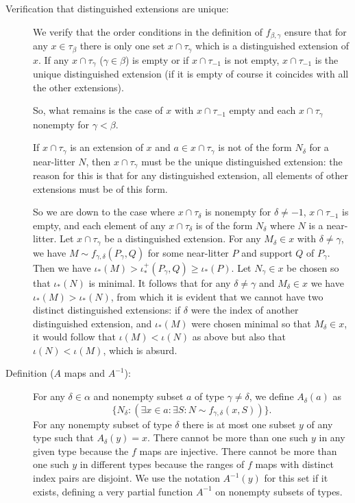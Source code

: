 \documentclass[112pt]{article}
\begin{document}
\begin{description}

\item[Verification that distinguished extensions are unique:]  

We verify  that the order conditions in the definition of $f_{\beta,\gamma}$ ensure that for any $x \in \tau_\beta$ there is only one set $x \cap \tau_\gamma$ which is a distinguished extension of $x$.  If any $x \cap \tau_\gamma$ ($\gamma \in \beta$) is empty or if $x \cap \tau_{-1}$ is not empty, $x \cap \tau_{-1}$ is the unique distinguished extension
(if it is empty of course it coincides with all the other extensions).

So, what remains is the case of $x$ with $x \cap \tau_{-1}$ empty and each $x \cap \tau_\gamma$ nonempty for $\gamma<\beta$.

If $x \cap \tau_\gamma$ is an extension of $x$ and $a \in x \cap \tau_\gamma$ is not of the form $N_\delta$ for a near-litter $N$, then
$x \cap \tau_\gamma$ must be the unique distinguished extension:  the reason for this is that for any distinguished extension, all elements of other extensions must be of this form.

So we are down to the case where $x \cap \tau_\delta$ is nonempty for $\delta \neq -1$, $x \cap \tau_{-1}$ is empty, and each element of
any $x \cap \tau_\delta$ is of the form $N_\delta$ where $N$ is a near-litter.  Let $x \cap \tau_\gamma$ be a distinguished extension.
For any $M_\delta \in x$ with $\delta \neq \gamma$, we have $M \sim f_{\gamma,\delta}(P_\gamma,Q)$ for some near-litter $P$ and support $Q$
of $P_\gamma$.  Then we have $\iota_*(M) > \iota^+_*(P_\gamma,Q) \geq \iota_*(P)$.  Let $N_\gamma\in x$ be chosen so that $\iota_*(N)$ is minimal.
It follows that for any $\delta \neq \gamma$ and $M_\delta \in x$ we have $\iota_*(M) > \iota_*(N)$, from which it is evident that we cannot have two distinct distinguished extensions:
if $\delta$ were the index of another distinguished extension, and $\iota_*(M)$ were chosen minimal so that $M_\delta \in x$, it would follow that $\iota(M)<\iota(N)$ as above
but also that $\iota(N) < \iota(M)$, which is absurd.

\item[Definition ($A$ maps and $A^{-1}$):] For any $\delta \in \alpha$ and nonempty subset $a$ of type $\gamma \neq \delta$, we define $A_\delta(a)$ as $$\{N_\delta:(\exists x \in a:\exists S:N \sim f_{\gamma,\delta}(x,S))\}.$$  For any nonempty subset of type $\delta$ there is at most one subset $y$ of any type such that $A_\delta(y)=x$.  There cannot be more than one such $y$ in any given type because the $f$ maps are injective.  There cannot be more than one such $y$ in different types because the ranges of $f$ maps with distinct index pairs are disjoint.   We use the notation $A^{-1}(y)$ for this set if it exists, defining a very partial function $A^{-1}$ on nonempty subsets of types.

\end{description}
\end{document}
